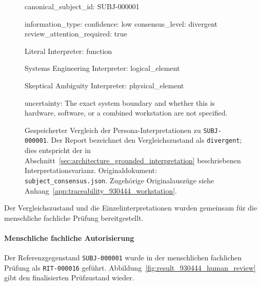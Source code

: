 \begin{figure}[htbp]
    \centering
    \begin{minipage}{0.94\textwidth}
        \begin{evidencebox}
canonical_subject_id: SUBJ-000001

information_type:
  confidence:                low
  consensus_level:           divergent
  review_attention_required: true

Literal Interpreter:
  function

Systems Engineering Interpreter:
  logical_element

Skeptical Ambiguity Interpreter:
  physical_element

uncertainty:
  The exact system boundary and whether this is hardware,
  software, or a combined workstation are not specified.
        \end{evidencebox}
    \end{minipage}
    \caption[Persona-Interpretationen zur Microscope Workstation]{
    Gespeicherter Vergleich der Persona-Interpretationen zu
    \texttt{SUBJ-000001}. Der Report bezeichnet den Vergleichszustand als
    \texttt{divergent}; dies entspricht der in
    Abschnitt~\ref{sec:architecture_grounded_interpretation} beschriebenen
    Interpretationsvarianz. Originaldokument:
    \texttt{subject\_consensus.json}. Zugehörige Originalauszüge siehe
    Anhang~\ref{app:traceability_930444_workstation}.}
    \label{fig:result_930444_consensus}
\end{figure}

Der Vergleichszustand und die Einzelinterpretationen wurden gemeinsam für
die menschliche fachliche Prüfung bereitgestellt.

\paragraph{Menschliche fachliche Autorisierung}

Der Referenzgegenstand \texttt{SUBJ-000001} wurde in der menschlichen
fachlichen Prüfung als \texttt{RIT-000016} geführt.
Abbildung~\ref{fig:result_930444_human_review} gibt den finalisierten
Prüfzustand wieder.

